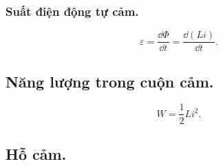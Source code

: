 \begin{appendices}
\subsubsection{Suất điện động tự cảm.}
    $$\varepsilon=\dfrac{\dd\Phi}{\dd t}=\dfrac{\dd(Li)}{\dd t}.$$
\subsection{Năng lượng trong cuộn cảm.}
    $$W=\dfrac{1}{2}Li^2.$$
\subsection{Hỗ cảm.}
    \begin{center}



\begin{tikzpicture}[x=0.7pt,y=0.7pt,yscale=-0.9,xscale=0.9]


\end{tikzpicture}
\end{center}
\end{appendices}
